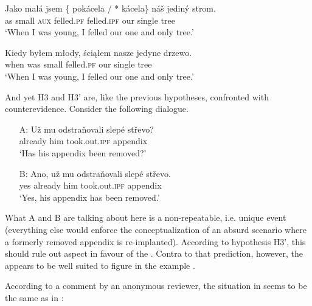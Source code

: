 \documentclass[output=paper,modfonts,newtxmath,hidelinks]{langscibook}
\begin{document}
\begin{exe}
\ex\label{13:baumfaell}
\gll Jako mal\'a jsem \{\hspace{-2pt} pok\'acela / *\hspace{-2pt} k\'acela\} n\'a\v{s} jedin\'y strom. \\
as small \textsc{aux} {} felled.\textsc{pf} {} {} felled.\textsc{ipf} our single tree \\
\glt `When I was young, I felled our one and only tree.'
\end{exe}
\begin{exe}
\ex\label{13:baumfaellpf}
\gll Kiedy by\l{e}m m\l{o}dy, \'sci\k a\l{e}m nasze jedyne drzewo. \\
when was small felled.\textsc{pf} our
single tree \\
\glt `When I was young, I felled our one and only tree.'
\end{exe}

\noindent And yet H3 and H3' are, like the previous hypotheses, confronted with counterevidence. Consider the following  dialogue. 

\begin{exe}
\ex\label{13:blinddarm}
\begin{itemize}
 \item[A:] \gll U\v{z} mu odstra\v{n}ovali {slep\'e st\v{r}evo?} \\
already him took.out.\textsc{ipf} appendix\\
\glt `Has his appendix been removed?'\vspace{0.2cm}
\item[B:] \gll Ano, u\v{z} mu odstra\v{n}ovali {slep\'e st\v{r}evo.} \\
yes already him took.out.\textsc{ipf} appendix \\
\glt `Yes, his appendix has been removed.'
\end{itemize}
\end{exe}

\noindent What A and B are talking about here is a non-repeatable, i.e. unique event (everything else would enforce the conceptualization of 
an absurd scenario where a formerly removed appendix is re-implanted). According to hypothesis H3', this should rule out  
aspect in favour of the . Contra to that prediction, however, the  appears to be well suited to figure in the  example .

According to a comment by an anonymous reviewer, the situation in  seems to be the same as in :  
\end{document}
